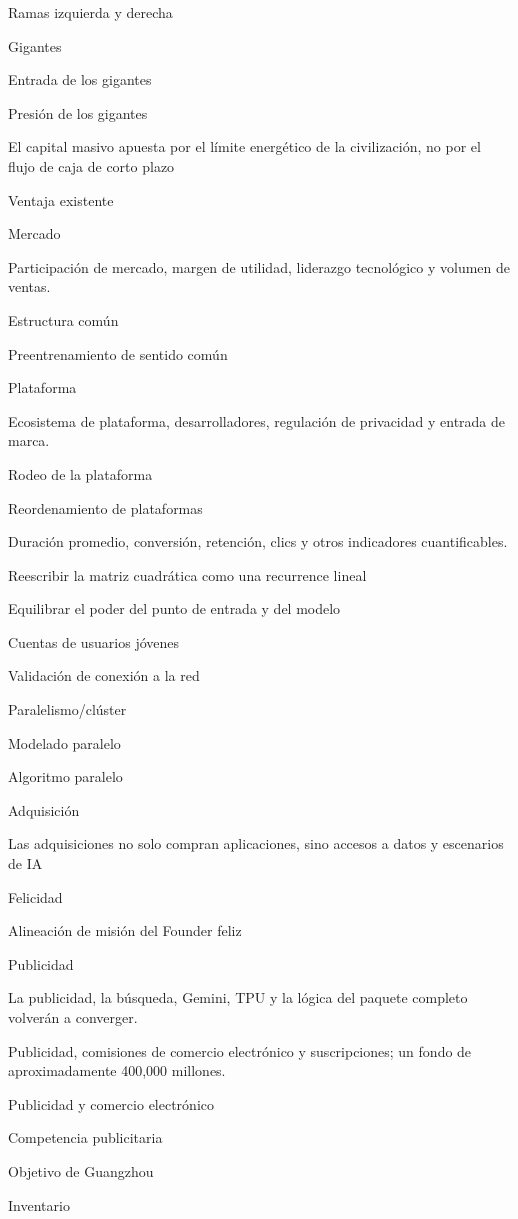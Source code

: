 \documentclass{article}
\begin{document}
Ramas izquierda y derecha

Gigantes

Entrada de los gigantes

Presión de los gigantes

El capital masivo apuesta por el límite energético de la civilización, no por el flujo de caja de corto plazo

Ventaja existente

Mercado

Participación de mercado, margen de utilidad, liderazgo tecnológico y volumen de ventas.

Estructura común

Preentrenamiento de sentido común

Plataforma

Ecosistema de plataforma, desarrolladores, regulación de privacidad y entrada de marca.

Rodeo de la plataforma

Reordenamiento de plataformas

Duración promedio, conversión, retención, clics y otros indicadores cuantificables.

Reescribir la matriz cuadrática como una recurrence lineal

Equilibrar el poder del punto de entrada y del modelo

Cuentas de usuarios jóvenes

Validación de conexión a la red

Paralelismo/clúster

Modelado paralelo

Algoritmo paralelo

Adquisición

Las adquisiciones no solo compran aplicaciones, sino accesos a datos y escenarios de IA

Felicidad

Alineación de misión del Founder feliz

Publicidad

La publicidad, la búsqueda, Gemini, TPU y la lógica del paquete completo volverán a converger.

Publicidad, comisiones de comercio electrónico y suscripciones; un fondo de aproximadamente 400,000 millones.

Publicidad y comercio electrónico

Competencia publicitaria

Objetivo de Guangzhou

Inventario
\end{document}
